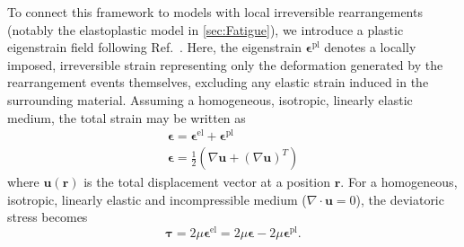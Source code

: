 To connect this framework to models with local irreversible rearrangements (notably the elastoplastic model in \cref{sec:Fatigue}), we introduce a plastic eigenstrain field following Ref.~\cite{picard_elastic_2004}. Here, the eigenstrain $\bm{\epsilon}^{\mathrm{pl}}$ denotes a locally imposed, irreversible strain representing only the deformation generated by the rearrangement events themselves, excluding any elastic strain induced in the surrounding material. Assuming a homogeneous, isotropic, linearly elastic medium, the total strain may be written as
\begin{subequations}    \label{eq:decompositionAndDeformation} \label{eq:EPStrain}
\begin{gather}
    \bm{\epsilon} = \bm{\epsilon}^{\mathrm{el}} + \bm{\epsilon}^{\mathrm{pl}}
    \label{eq:strainDecomp} \\
    \bm{\epsilon} =
    \frac{1}{2}\left(\nabla \bm{u} + (\nabla \bm{u})^{T}\right)
\end{gather}
\end{subequations}
where $\bm{u}(\bm{r})$ is the total displacement vector at a position $\bm{r}$. For a homogeneous, isotropic, linearly elastic and incompressible medium ($\nabla\cdot\bm{u}=0$), the deviatoric stress becomes
\begin{equation}
    \bm{\tau} = 2\mu \bm{\epsilon}^{\mathrm{el}} = 2\mu\bm{\epsilon} - 2\mu\bm{\epsilon}^{\mathrm{pl}}.
    \label{eq:elasticStress}
\end{equation}


